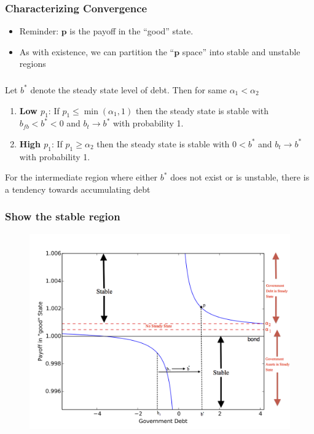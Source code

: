 \documentclass{beamer}
\begin{document}
% 
% 
 \begin{frame}
  \frametitle{Characterizing Convergence}

  \begin{itemize}
  \item Reminder:  $\bm{p}$ is the payoff in the ``good'' state.
   \item As with existence, we can partition  the ``$\bm{p}$ space'' into stable and unstable regions
   
  \end{itemize}
  
  
  
  \end{frame}
  
  \begin{frame}
  \frametitle{}
  
  \small
 	\begin{theorem}
Let $b^*$ denote the steady state level of debt.  Then for  same $  \alpha_1 < \alpha_2$
		\begin{enumerate}
			\item  \textbf{Low $p_1$}: If $p_1\leq\min(\alpha_1,1)$ then the steady state is stable with $b_{fb}<b^*<0$ and $b_t\rightarrow b^*$ with probability 1.
			\item \textbf{High  $p_1$}:  If $p_1 \geq \alpha_2$ then the steady state is stable with $0<b^*$ and $b_t \rightarrow b^*$ with probability 1.
			
			
			\end{enumerate}
			\end{theorem}
			
			For the intermediate region where either $b^*$ does not exist or is unstable, there is a tendency towards accumulating debt
		
		
	
 \end{frame}

 
\begin{frame}
   \frametitle{Show the stable region}
	\begin{figure}
		\begin{center}
		\includegraphics[scale=.5]{Images/graph.png}
	\end{center}	
	\end{figure}

  \end{frame}
\end{document}
